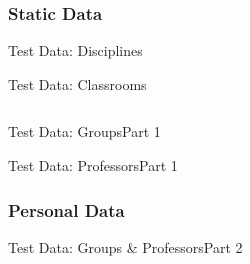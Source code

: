 \subsubsection{Static Data}

\begin{frame}{Test Data: Disciplines}
  \centering
\end{frame}

\begin{frame}{Test Data: Classrooms}
  \begin{columns}
    \begin{column}{.5\textwidth}
    \end{column}
    \begin{column}{.4\textwidth}
    \end{column}
  \end{columns}
\end{frame}

\begin{frame}{Test Data: Groups}{Part 1}
\end{frame}

\begin{frame}{Test Data: Professors}{Part 1}
  \centering
\end{frame}

\subsubsection{Personal Data}

\begin{frame}{Test Data: Groups \& Professors}{Part 2}
  \begin{columns}[t]
    \begin{column}{.5\textwidth}
    \end{column}
    \begin{column}{.5\textwidth}
    \end{column}
  \end{columns}
\end{frame}




